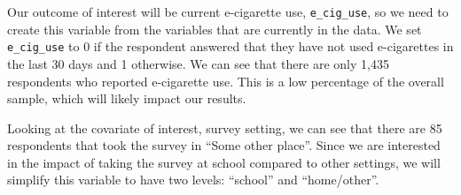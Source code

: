 \documentclass[
  letterpaper,
]{krantz}
\makeatletter
\newenvironment{Shaded}{\begin{snugshade}}{\end{snugshade}}
\newcommand{\CommentTok}[1]{\textcolor[rgb]{0.37,0.37,0.37}{#1}}
\newcommand{\DecValTok}[1]{\textcolor[rgb]{0.68,0.00,0.00}{#1}}
\newcommand{\FunctionTok}[1]{\textcolor[rgb]{0.28,0.35,0.67}{#1}}
\newcommand{\NormalTok}[1]{\textcolor[rgb]{0.00,0.23,0.31}{#1}}
\newcommand{\OtherTok}[1]{\textcolor[rgb]{0.00,0.23,0.31}{#1}}
\newcommand{\SpecialCharTok}[1]{\textcolor[rgb]{0.37,0.37,0.37}{#1}}
\newcommand{\StringTok}[1]{\textcolor[rgb]{0.13,0.47,0.30}{#1}}
\newenvironment{kframe}{%
\medskip{}
\setlength{\fboxsep}{.8em}
 \def\at@end@of@kframe{}%
 \ifinner\ifhmode%
  \def\at@end@of@kframe{\end{minipage}}%
  \begin{minipage}{\columnwidth}%
 \fi\fi%
 \def\FrameCommand##1{\hskip\@totalleftmargin \hskip-\fboxsep
 \colorbox{shadecolor}{##1}\hskip-\fboxsep
     \hskip-\linewidth \hskip-\@totalleftmargin \hskip\columnwidth}%
 \MakeFramed {\advance\hsize-\width
   \@totalleftmargin\z@ \linewidth\hsize
   \@setminipage}}%
 {\par\unskip\endMakeFramed%
 \at@end@of@kframe}
\renewenvironment{Shaded}{\begin{kframe}}{\end{kframe}}
\makeatother
\begin{document}
Our outcome of interest will be current e-cigarette use,
\texttt{e\_cig\_use}, so we need to create this variable from the
variables that are currently in the data. We set \texttt{e\_cig\_use} to
0 if the respondent answered that they have not used e-cigarettes in the
last 30 days and 1 otherwise. We can see that there are only 1,435
respondents who reported e-cigarette use. This is a low percentage of
the overall sample, which will likely impact our results.

\begin{Shaded}
\end{Shaded}

Looking at the covariate of interest, survey setting, we can see that
there are 85 respondents that took the survey in ``Some other place''.
Since we are interested in the impact of taking the survey at school
compared to other settings, we will simplify this variable to have two
levels: ``school'' and ``home/other''.

\begin{Shaded}
\end{Shaded}
\end{document}
